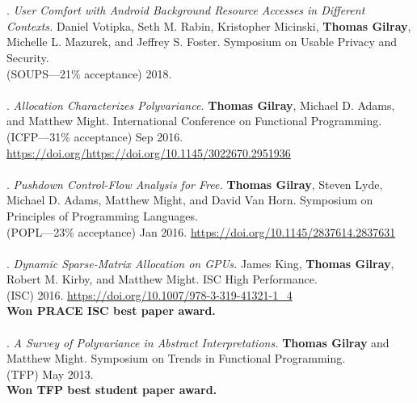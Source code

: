 \\ \vspace{-0.1cm}\\
\paper. \textit{User Comfort with Android Background Resource Accesses in Different Contexts.}
Daniel Votipka, Seth M. Rabin, Kristopher Micinski, \textbf{Thomas Gilray}, Michelle L. Mazurek, and Jeffrey S. Foster.
Symposium on Usable Privacy and Security.
\\(SOUPS---21\% acceptance) 2018.
\\ \vspace{-0.1cm}\\
\paper. \textit{Allocation Characterizes Polyvariance.}
\textbf{Thomas Gilray}, Michael D. Adams, and Matthew Might.
International Conference on Functional Programming.
\\(ICFP---31\% acceptance) Sep 2016. \url{https://doi.org/https://doi.org/10.1145/3022670.2951936}
\\ \vspace{-0.1cm}\\
\paper. \textit{Pushdown Control-Flow Analysis for Free.}
\textbf{Thomas Gilray}, Steven Lyde, Michael D. Adams, Matthew Might, and David Van Horn.
Symposium on Principles of Programming Languages.
\\(POPL---23\% acceptance) Jan 2016. \url{https://doi.org/10.1145/2837614.2837631}
\\ \vspace{-0.1cm}\\
\paper. \textit{Dynamic Sparse-Matrix Allocation on GPUs.}
James King, \textbf{Thomas Gilray}, Robert M. Kirby, and Matthew Might.
ISC High Performance.
\\(ISC) 2016. \url{https://doi.org/10.1007/978-3-319-41321-1_4}
\\\textbf{Won PRACE ISC best paper award.} \\ \vspace{-0.1cm}\\
\paper. \textit{A Survey of Polyvariance in Abstract Interpretations.}
\textbf{Thomas Gilray} and Matthew Might.
Symposium on Trends in Functional Programming.
\\(TFP) May 2013.
\\\textbf{Won TFP best student paper award.} \\ \vspace{-0.1cm}\\
